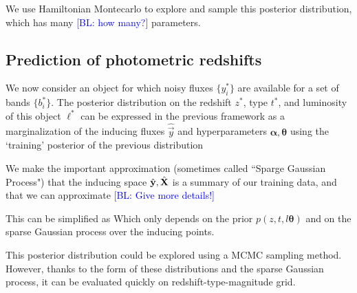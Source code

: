 \documentclass[aps,prd,showpacs,superscriptaddress,groupedaddress]{revtex4}  %
\newcommand{\bl}[1]{\textcolor{blue}{[BL: #1]}}
\begin{document}
We use Hamiltonian Montecarlo to explore and sample this posterior distribution, which has many \bl{how many?} parameters.

\subsection{Prediction of photometric redshifts}

We now consider an object for which noisy fluxes $\{ y_i^* \}$ are available for a set of bands $\{ b_i^* \}$. 
The posterior distribution on the redshift $z^*$, type $t^*$, and luminosity of this object $\ell^*$ can be expressed in the previous framework as a marginalization of the inducing fluxes $\hat{\vec{y}}$ and hyperparameters $\bm{\alpha}, \bm{\theta}$ using the `training' posterior of the previous distribution
 
We make the important approximation (sometimes called ``Sparge Gaussian Process") that the inducing space $\hat{\vec{y}}, \hat{\mat{X}}$ is a summary of our training data, and that we can approximate
\bl{Give more details!}

This can be simplified as
Which only depends on the prior $p(z,t,l \bm{\theta}) $ and on the sparse Gaussian process over the inducing points.

This posterior distribution could be explored using a MCMC sampling method.
However, thanks to the form of these distributions and the sparse Gaussian process, it can be evaluated quickly on redshift-type-magnitude grid.
\end{document}
